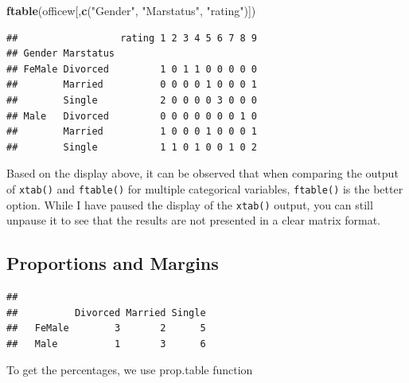 \documentclass[
]{article}
\newenvironment{Shaded}{\begin{snugshade}}{\end{snugshade}}
\newcommand{\DecValTok}[1]{\textcolor[rgb]{0.00,0.00,0.81}{#1}}
\newcommand{\FunctionTok}[1]{\textcolor[rgb]{0.13,0.29,0.53}{\textbf{#1}}}
\newcommand{\NormalTok}[1]{#1}
\newcommand{\SpecialCharTok}[1]{\textcolor[rgb]{0.81,0.36,0.00}{\textbf{#1}}}
\newcommand{\StringTok}[1]{\textcolor[rgb]{0.31,0.60,0.02}{#1}}
\begin{document}
\begin{Shaded}
\begin{Highlighting}[]
\FunctionTok{ftable}\NormalTok{(officew[,}\FunctionTok{c}\NormalTok{(}\StringTok{"Gender"}\NormalTok{, }\StringTok{"Marstatus"}\NormalTok{, }\StringTok{"rating"}\NormalTok{)])}
\end{Highlighting}
\end{Shaded}

\begin{verbatim}
##                  rating 1 2 3 4 5 6 7 8 9
## Gender Marstatus                         
## FeMale Divorced         1 0 1 1 0 0 0 0 0
##        Married          0 0 0 0 1 0 0 0 1
##        Single           2 0 0 0 0 3 0 0 0
## Male   Divorced         0 0 0 0 0 0 0 1 0
##        Married          1 0 0 0 1 0 0 0 1
##        Single           1 1 0 1 0 0 1 0 2
\end{verbatim}

Based on the display above, it can be observed that when comparing the
output of \texttt{xtab()} and \texttt{ftable()} for multiple categorical
variables, \texttt{ftable()} is the better option. While I have paused
the display of the \texttt{xtab()} output, you can still unpause it to
see that the results are not presented in a clear matrix format.

\hypertarget{proportions-and-margins}{%
\subsection{Proportions and Margins}\label{proportions-and-margins}}

\begin{Shaded}
\end{Shaded}

\begin{verbatim}
##         
##          Divorced Married Single
##   FeMale        3       2      5
##   Male          1       3      6
\end{verbatim}

To get the percentages, we use prop.table function

\begin{Shaded}
\end{Shaded}
\end{document}
